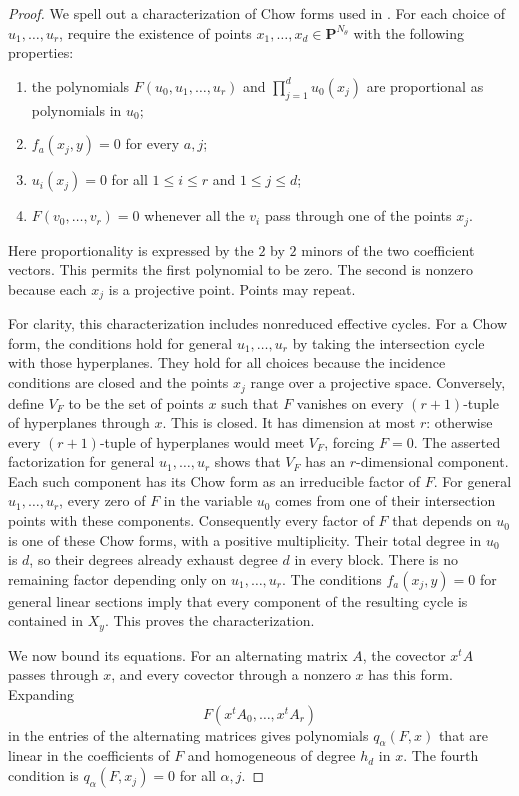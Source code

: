\documentclass[11pt]{article}
\theoremstyle{definition}
\theoremstyle{remark}
\begin{document}
\begin{proof}
We spell out a characterization of Chow forms used in
\cite[\S5.2, pp.~16--17]{GuerraPirola2009}.  For each choice of
$u_1,\ldots,u_r$, require the existence of points
$x_1,\ldots,x_d\in\mathbf P^{N_\theta}$ with the following properties:
\begin{enumerate}
\item the polynomials $F(u_0,u_1,\ldots,u_r)$ and
$\prod_{j=1}^{d}u_0(x_j)$ are proportional as polynomials in $u_0$;
\item $f_a(x_j,y)=0$ for every $a,j$;
\item $u_i(x_j)=0$ for all $1\leq i\leq r$ and $1\leq j\leq d$;
\item $F(v_0,\ldots,v_r)=0$ whenever all the $v_i$ pass through
one of the points $x_j$.
\end{enumerate}
Here proportionality is expressed by the $2$ by $2$ minors of the
two coefficient vectors.  This permits the first polynomial to be
zero.  The second is nonzero because each $x_j$ is a projective
point.  Points may repeat.

For clarity, this characterization includes nonreduced effective
cycles.  For a Chow form, the conditions hold for general
$u_1,\ldots,u_r$ by taking the intersection cycle with those
hyperplanes.  They hold for all choices because the incidence
conditions are closed and the points $x_j$ range over a projective
space.  Conversely, define $V_F$ to be the set of points $x$ such
that $F$ vanishes on every $(r+1)$-tuple of hyperplanes through $x$.
This is closed.  It has dimension at most $r$: otherwise every
$(r+1)$-tuple of hyperplanes would meet $V_F$, forcing $F=0$.
The asserted factorization for general $u_1,\ldots,u_r$ shows that
$V_F$ has an $r$-dimensional component.  Each such component has
its Chow form as an irreducible factor of $F$.  For general
$u_1,\ldots,u_r$, every zero of $F$ in the variable $u_0$ comes
from one of their intersection points with these components.
Consequently every factor of $F$ that depends on $u_0$ is one of
these Chow forms, with a positive multiplicity.  Their total degree
in $u_0$ is $d$, so their degrees already exhaust degree $d$ in
every block.  There is no remaining factor depending only on
$u_1,\ldots,u_r$.  The conditions $f_a(x_j,y)=0$ for general
linear sections imply that every component of the resulting cycle
is contained in $X_y$.  This proves the characterization.

We now bound its equations.  For an alternating matrix $A$, the
covector $x^tA$ passes through $x$, and every covector through a
nonzero $x$ has this form.  Expanding
\[
 F(x^tA_0,\ldots,x^tA_r)
\]
in the entries of the alternating matrices gives polynomials
$q_\alpha(F,x)$ that are linear in the coefficients of $F$ and
homogeneous of degree $h_d$ in $x$.  The fourth condition is
$q_\alpha(F,x_j)=0$ for all $\alpha,j$.


\end{proof}
\end{document}
